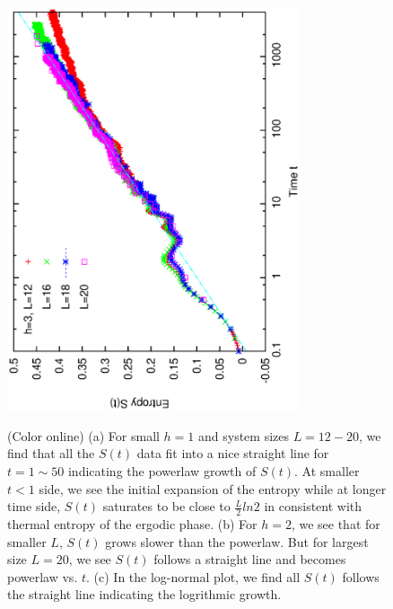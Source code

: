 \documentclass[prl,aps,epsf,showpacs,twocolumn]{revtex4}
\begin{document}
\begin{figure}[b]
\hspace{0.0in}
\vspace{-0.24in}
 \includegraphics[angle=-90,width=3.4in]{newfig1e.ps}\\
\vspace{0.1in}
\caption{(Color online) (a) For small $h=1$ and system sizes $L=12-20$,   we find that 
all the $S(t)$ data fit into a nice straight line for $t=1\sim 50$ indicating the powerlaw growth of $S(t)$.
At smaller $t<1$ side,  we see the initial expansion of the entropy  while at longer time  side, $S(t)$ saturates
to be close to $\frac L 2 ln2$ in consistent with thermal entropy of the ergodic phase.
(b) For $h=2$,  we see that for smaller $L$, $S(t)$ grows slower than the powerlaw.
But for largest size $L=20$, we see $S(t)$ follows a straight line and becomes powerlaw vs. $t$.
(c) In the log-normal plot, we find all $S(t)$ follows the straight line indicating the 
logrithmic growth.
 }
\label{fig1}
\end{figure}
\end{document}

